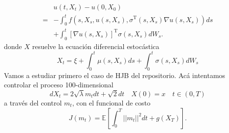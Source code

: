 \documentclass{article}
\begin{document}
\begin{equation}
	\begin{aligned}
		& u\left(t, X_t\right)-u\left(0, X_0\right) \\
		=&-\int_0^t f\left(s, X_s, u\left(s, X_s\right), \sigma^{\mathrm{T}}\left(s, X_s\right) \nabla u\left(s, X_s\right)\right) d s \\
		&+\int_0^t\left[\nabla u\left(s, X_s\right)\right]^{\mathrm{T}} \sigma\left(s, X_s\right) d W_s .
	\end{aligned}
\end{equation}
donde $X$ resuelve la ecuación diferencial estocástica
\begin{equation}
	X_t=\xi+\int_0^t \mu\left(s, X_s\right) d s+\int_0^t \sigma\left(s, X_s\right) d W_s
\end{equation}
Vamos a estudiar primero el caso de HJB del repositorio. Acá intentamos controlar el proceso 100-dimensional
\begin{equation}
	dX_t=2\sqrt{\lambda}m_t dt +\sqrt{2}dt \quad X(0)=x \quad t\in (0,T)
\end{equation}
a través del control $m_t$, con el funcional de costo
\begin{equation}
	J(m_t)=\mathbb{E}\left[\int_{0}^{T}||m_t||^2 dt +g(X_T)\right].
\end{equation}
\end{document}
